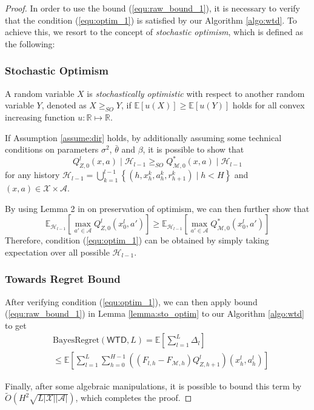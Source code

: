 \documentclass[letterpaper]{article} %
\newcommand{\Sp}[1]{\left(#1\right)}
\newcommand{\Mp}[1]{\left[#1\right]}
\newcommand{\Bp}[1]{\left\{#1\right\}}
\newcommand{\abs}[1]{\left|#1\right|}
\newcommand{\E}{\mathbb{E}}
\newcommand{\R}{\mathbb{R}}
\newcommand{\M}{\mathcal{M}}
\newcommand{\aX}{\abs{\mathcal{X}}}
\newcommand{\aA}{\abs{\mathcal{A}}}
\theoremstyle{definition}
\begin{document}
\begin{proof}
In order to use the bound (\ref{equ:raw_bound_1}), it is necessary to verify that the condition (\ref{equ:optim_1}) is satisfied by our Algorithm \ref{algo:wtd}. To achieve this, we resort to the concept of \textit{stochastic optimism}, which is defined as the following:
\subsubsection{Stochastic Optimism}
A random variable $X$ is \textit{stochastically optimistic} with respect to another random variable $Y$, denoted as $X\geq_{SO}Y$, if $\E\Mp{u\Sp{X}}\geq\E\Mp{u\Sp{Y}}$ holds for all convex increasing function $u:\R\mapsto\R$.

If Assumption \ref{assume:dir} holds, by additionally assuming some technical conditions on parameters $\sigma^2$, $\bar{\theta}$ and $\beta$, it is possible to show that
$$Q^l_{Z, 0}\Sp{x, a}\mid\mathcal{H}_{l-1}\geq_{SO}Q^*_{\M, 0}\Sp{x, a}\mid\mathcal{H}_{l-1}$$
for any history $\mathcal{H}_{l-1}=\bigcup_{k=1}^{l-1}\Bp{\Sp{h, x_h^k, a_h^k, r_{h+1}^k}\mid h<H}$ and $\Sp{x,a}\in\mathcal{X}\times\mathcal{A}$.

By using Lemma 2 in \cite{osband2017deep} on preservation of optimism, we can then further show that
\fontsize{9}{9}
$$\E_{\mathcal{H}_{l-1}}\Mp{\max_{a'\in\mathcal{A}}Q^l_{Z, 0}\Sp{x^l_0, a'}}\geq\E_{\mathcal{H}_{l-1}}\Mp{\max_{a'\in\mathcal{A}}Q^*_{\M, 0}\Sp{x^l_0, a'}}$$
\normalsize
Therefore, condition (\ref{equ:optim_1}) can be obtained by simply taking expectation over all possible $\mathcal{H}_{l-1}$.

\subsubsection{Towards Regret Bound}
After verifying condition (\ref{equ:optim_1}), we can then apply bound (\ref{equ:raw_bound_1}) in Lemma \ref{lemma:sto_optim} to our Algorithm \ref{algo:wtd} to get
\begin{align*}
    &\mathrm{BayesRegret}\Sp{\mathsf{WTD}, L}=\E\Mp{\sum_{l=1}^{L}\Delta_l}\\
    &\leq\E\Mp{\sum_{l=1}^{L}\sum_{h=0}^{H-1}\Sp{\Sp{F_{l, h}-F_{\M, h}}Q^l_{Z, h+1}}\Sp{x_h^l, a_h^l}}
\end{align*}

Finally, after some algebraic manipulations, it is possible to bound this term by $\widetilde{O}\Sp{H^2\sqrt{L\aX\aA}}$, which completes the proof.
\end{proof}
\end{document}
